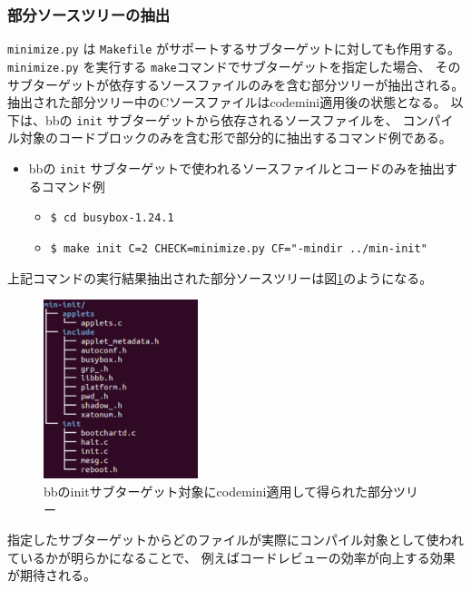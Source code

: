 \subsubsection{部分ソースツリーの抽出}
\verb|minimize.py| は \verb|Makefile| がサポートするサブターゲットに対しても作用する。
\verb|minimize.py| を実行する \verb|make|コマンドでサブターゲットを指定した場合、
そのサブターゲットが依存するソースファイルのみを含む部分ツリーが抽出される。
抽出された部分ツリー中のCソースファイルは\acrshort{codemini}適用後の状態となる。
以下は、\acrshort{bb}の \verb|init| サブターゲットから依存されるソースファイルを、
コンパイル対象のコードブロックのみを含む形で部分的に抽出するコマンド例である。
\begin{itemize}
  \item \acrshort{bb}の \verb|init| サブターゲットで使われるソースファイルとコードのみを抽出するコマンド例
  \begin{itemize}
    \item[] \verb!$ cd busybox-1.24.1!
    \item[] \verb!$ make init C=2 CHECK=minimize.py CF="-mindir ../min-init"!
  \end{itemize}
\end{itemize}
\par
上記コマンドの実行結果抽出された部分ソースツリーは図\ref{subtarget}のようになる。
\begin{figure}[ht]
  \centering
  \includegraphics[width=0.4\textwidth]{pic/subtarget.eps}
  \caption{\acrshort{bb}のinitサブターゲット対象に\acrshort{codemini}適用して得られた部分ツリー}
  \label{subtarget}
\end{figure}
\par
指定したサブターゲットからどのファイルが実際にコンパイル対象として使われているかが明らかになることで、
例えばコードレビューの効率が向上する効果が期待される。
